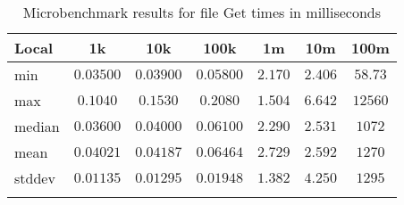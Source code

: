 \begin{table}
{\begin{tabular}[h]{l|c|c|c|c|c|c}
\textbf{Local} & \textbf{1k} & \textbf{10k} & \textbf{100k} & \textbf{1m} & \textbf{10m} & \textbf{100m} \\
\hline
min & $0.03500$ & $0.03900$ & $0.05800$ & $2.170$ & $2.406$ & $58.73$ \\
max & $0.1040$ & $0.1530$ & $0.2080$ & $1.504$ & $6.642$ & $12560$ \\
median & $0.03600$ & $0.04000$ & $0.06100$ & $2.290$ & $2.531$ & $1072$ \\
mean & $0.04021$ & $0.04187$ & $0.06464$ & $2.729$ & $2.592$ & $1270$ \\
stddev & $0.01135$ & $0.01295$ & $0.01948$ & $1.382$ & $4.250$ & $1295$ \\
\\

\end{tabular}
}
\caption{Microbenchmark results for file Get times in milliseconds}
\end{table}

